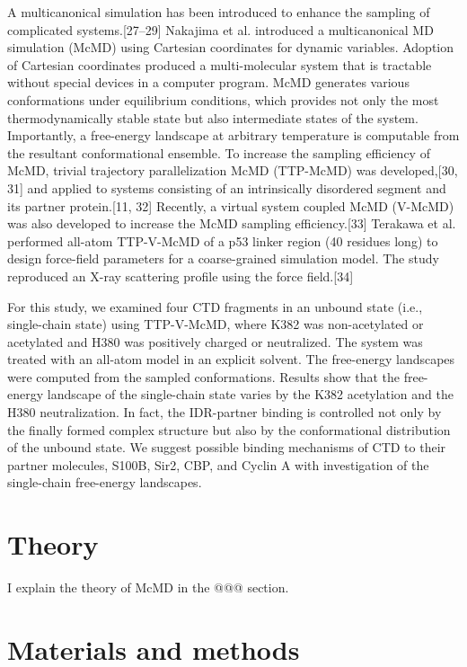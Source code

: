 A multicanonical simulation has been introduced to enhance the sampling of complicated systems.[27–29] Nakajima et al. introduced a multicanonical MD simulation (McMD) using Cartesian coordinates for dynamic variables. Adoption of Cartesian coordinates produced a multi-molecular system that is tractable without special devices in a computer program. McMD generates various conformations under equilibrium conditions, which provides not only the most thermodynamically stable state but also intermediate states of the system. Importantly, a free-energy landscape at arbitrary temperature is computable from the resultant conformational ensemble. To increase the sampling efficiency of McMD, trivial trajectory parallelization McMD (TTP-McMD) was developed,[30, 31] and applied to systems consisting of an intrinsically disordered segment and its partner protein.[11, 32] Recently, a virtual system coupled McMD (V-McMD) was also developed to increase the McMD sampling efficiency.[33] Terakawa et al. performed all-atom TTP-V-McMD of a p53 linker region (40 residues long) to design force-field parameters for a coarse-grained simulation model. The study reproduced an X-ray scattering profile using the force field.[34]

For this study, we examined four CTD fragments in an unbound state (i.e., single-chain state) using TTP-V-McMD, where K382 was non-acetylated or acetylated and H380 was positively charged or neutralized. The system was treated with an all-atom model in an explicit solvent. The free-energy landscapes were computed from the sampled conformations. Results show that the free-energy landscape of the single-chain state varies by the K382 acetylation and the H380 neutralization. In fact, the IDR-partner binding is controlled not only by the finally formed complex structure but also by the conformational distribution of the unbound state. We suggest possible binding mechanisms of CTD to their partner molecules, S100B, Sir2, CBP, and Cyclin A with investigation of the single-chain free-energy landscapes.

\section{Theory}
{\color{red}I explain the theory of McMD in the @@@ section.}

\section{Materials and methods}
